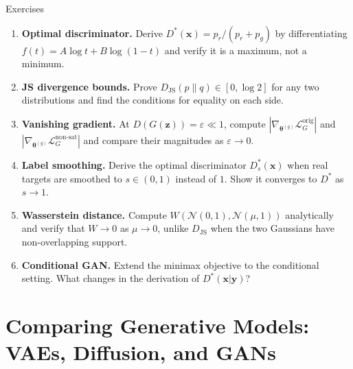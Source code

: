 \documentclass[aspectratio=169,11pt]{beamer}
\newcommand{\bx}{\bm{x}}
\newcommand{\bz}{\bm{z}}
\newcommand{\btheta}{\bm{\theta}}
\newcommand{\pr}{p_{r}}           %
\newcommand{\pg}{p_{g}}           %
\newcommand{\JS}{D_{\mathrm{JS}}} %
\begin{document}
\begin{frame}{Exercises}
  \begin{enumerate}
    \setlength\itemsep{5pt}
    \item \textbf{Optimal discriminator.}
          Derive $D^*(\bx)=\pr/(\pr+\pg)$ by differentiating
          $f(t)=A\log t+B\log(1-t)$ and verify it is a maximum, not a minimum.

    \item \textbf{JS divergence bounds.}
          Prove $\JS(p\|q)\in[0,\log 2]$ for any two distributions and
          find the conditions for equality on each side.

    \item \textbf{Vanishing gradient.}
          At $D(G(\bz))=\varepsilon\ll 1$, compute
          $|\nabla_{\btheta^{(g)}}\mathcal{L}_G^{\text{orig}}|$ and
          $|\nabla_{\btheta^{(g)}}\mathcal{L}_G^{\text{non-sat}}|$
          and compare their magnitudes as $\varepsilon\to 0$.

    \item \textbf{Label smoothing.}
          Derive the optimal discriminator $D^*_s(\bx)$ when real targets
          are smoothed to $s\in(0,1)$ instead of $1$.
          Show it converges to $D^*$ as $s\to 1$.

    \item \textbf{Wasserstein distance.}
          Compute $W(\mathcal{N}(0,1),\mathcal{N}(\mu,1))$ analytically
          and verify that $W\to 0$ as $\mu\to 0$, unlike $\JS$ when the
          two Gaussians have non-overlapping support.

    \item \textbf{Conditional GAN.}
          Extend the minimax objective to the conditional setting.
          What changes in the derivation of $D^*(\bx|\mathbf{y})$?
  \end{enumerate}
\end{frame}

\section{Comparing Generative Models: VAEs, Diffusion, and GANs}
\end{document}
